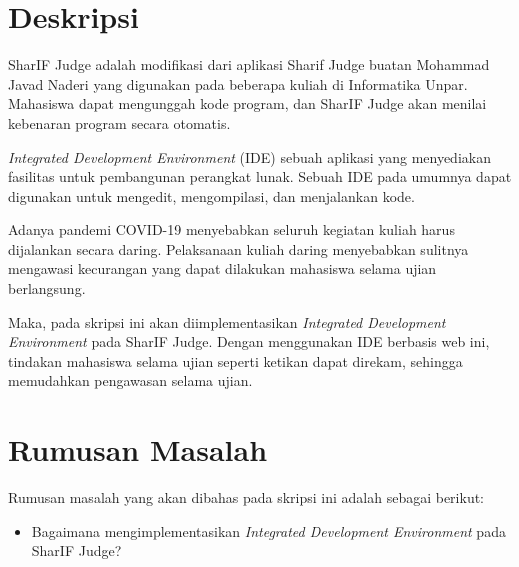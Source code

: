 \documentclass[a4paper,twoside]{article}
\begin{document}
\title{\@judultopik}
\author{\nama \textendash \@npm} 

\newcommand{\nama}{Nicholas Aditya Halim}
\newcommand{\@npm}{2017730018}
\newcommand{\@judultopik}{Implementasi Editor Kode pada SharIF Judge} %
\newcommand{\jumpemb}{1} %
\newcommand{\tanggal}{31/03/2021}


\maketitle


\section{Deskripsi}
SharIF Judge adalah modifikasi dari aplikasi Sharif Judge buatan Mohammad Javad Naderi yang digunakan pada beberapa kuliah di Informatika Unpar. Mahasiswa dapat mengunggah kode program, dan SharIF Judge akan menilai kebenaran program secara otomatis. 

{\it Integrated Development Environment} (IDE) sebuah aplikasi yang menyediakan fasilitas untuk pembangunan perangkat lunak. Sebuah IDE pada umumnya dapat digunakan untuk mengedit, mengompilasi, dan menjalankan kode.

Adanya pandemi COVID-19 menyebabkan seluruh kegiatan kuliah harus dijalankan secara daring. Pelaksanaan kuliah daring menyebabkan sulitnya mengawasi kecurangan yang dapat dilakukan mahasiswa selama ujian berlangsung. 

Maka, pada skripsi ini akan diimplementasikan {\it Integrated Development Environment} pada SharIF Judge. Dengan menggunakan IDE berbasis web ini, tindakan mahasiswa selama ujian seperti ketikan dapat direkam, sehingga memudahkan pengawasan selama ujian. 


\section{Rumusan Masalah}
Rumusan masalah yang akan dibahas pada skripsi ini adalah sebagai berikut:
\begin{itemize}
	\item Bagaimana mengimplementasikan {\it Integrated Development Environment} pada SharIF Judge?
\end{itemize}
\end{document}
